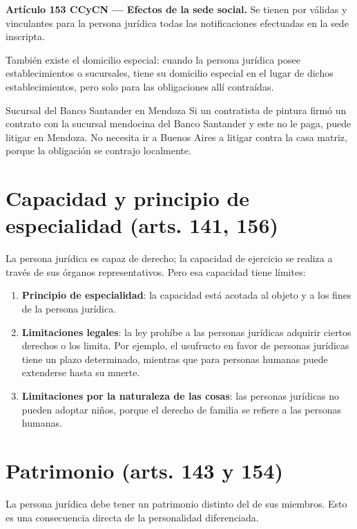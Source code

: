 \documentclass[12pt,oneside]{book}
\begin{document}
\begin{important}
\textbf{Artículo 153 CCyCN --- Efectos de la sede social.} Se tienen por válidas y vinculantes para la persona jurídica todas las notificaciones efectuadas en la sede inscripta.
\end{important}

También existe el domicilio especial: cuando la persona jurídica posee establecimientos o sucursales, tiene su domicilio especial en el lugar de dichos establecimientos, pero solo para las obligaciones allí contraídas.

\begin{example}{Sucursal del Banco Santander en Mendoza}
Si un contratista de pintura firmó un contrato con la sucursal mendocina del Banco Santander y este no le paga, puede litigar en Mendoza. No necesita ir a Buenos Aires a litigar contra la casa matriz, porque la obligación se contrajo localmente.
\end{example}

\section{Capacidad y principio de especialidad (arts. 141, 156)}

La persona jurídica es capaz de derecho; la capacidad de ejercicio se realiza a través de sus órganos representativos. Pero esa capacidad tiene límites:

\begin{enumerate}
    \item \textbf{Principio de especialidad}: la capacidad está acotada al objeto y a los fines de la persona jurídica.
    \item \textbf{Limitaciones legales}: la ley prohíbe a las personas jurídicas adquirir ciertos derechos o los limita. Por ejemplo, el usufructo en favor de personas jurídicas tiene un plazo determinado, mientras que para personas humanas puede extenderse hasta su muerte.
    \item \textbf{Limitaciones por la naturaleza de las cosas}: las personas jurídicas no pueden adoptar niños, porque el derecho de familia se refiere a las personas humanas.
\end{enumerate}

\section{Patrimonio (arts. 143 y 154)}

La persona jurídica debe tener un patrimonio distinto del de sus miembros. Esto es una consecuencia directa de la personalidad diferenciada.
\end{document}
